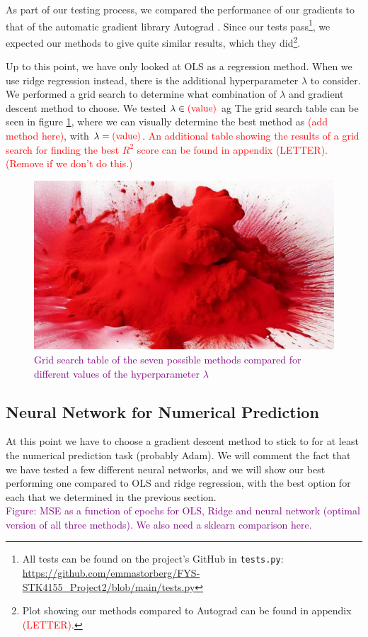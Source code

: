 As part of our testing process, we compared the performance of our gradients to that of the automatic gradient library Autograd \cite{autograd}. Since our tests pass\footnote{All tests can be found on the project's GitHub in \texttt{tests.py}: \url{https://github.com/emmastorberg/FYS-STK4155_Project2/blob/main/tests.py}}, we expected our methods to give quite similar results, which they did\footnote{Plot showing our methods compared to Autograd can be found in appendix \textcolor{red}{(LETTER)}.}. 

Up to this point, we have only looked at OLS as a regression method. When we use ridge regression instead, there is the additional hyperparameter $\lambda$ to consider. We performed a grid search to determine what combination of $\lambda$ and gradient descent method to choose. We tested $\lambda \in \text{\textcolor{red}{(value)}}$ ag The grid search table can be seen in figure \ref{fig:gridsearch_ridge}, where we can visually determine the best method as \textcolor{red}{(add method here)}, with $\lambda = \text{\textcolor{red}{(value)}}$. \textcolor{red}{An additional table showing the results of a grid search for finding the best $R^2$ score can be found in appendix (LETTER). (Remove if we don't do this.)} 
\begin{figure}
    \centering
    \includegraphics[width=0.5\linewidth]{figures/placeholders/gridsearch_ridge.png}
    \caption{\textcolor{purple}{Grid search table of the seven possible methods compared for different values of the hyperparameter $\lambda$}}
    \label{fig:gridsearch_ridge}
\end{figure}

\subsection{Neural Network for Numerical Prediction}
At this point we have to choose a gradient descent method to stick to for at least the numerical prediction task (probably Adam). We will comment the fact that we have tested a few different neural networks, and we will show our best performing one compared to OLS and ridge regression, with the best option for each that we determined in the previous section.\\
\textcolor{purple}{Figure: MSE as a function of epochs for OLS, Ridge and neural network (optimal version of all three methods). We also need a sklearn comparison here.}

